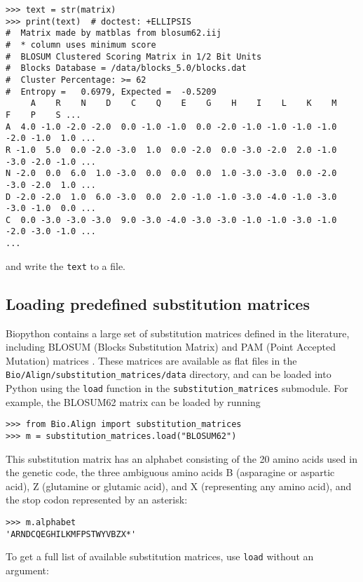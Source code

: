 \begin{verbatim}
>>> text = str(matrix)
>>> print(text)  # doctest: +ELLIPSIS
#  Matrix made by matblas from blosum62.iij
#  * column uses minimum score
#  BLOSUM Clustered Scoring Matrix in 1/2 Bit Units
#  Blocks Database = /data/blocks_5.0/blocks.dat
#  Cluster Percentage: >= 62
#  Entropy =   0.6979, Expected =  -0.5209
     A    R    N    D    C    Q    E    G    H    I    L    K    M    F    P    S ...
A  4.0 -1.0 -2.0 -2.0  0.0 -1.0 -1.0  0.0 -2.0 -1.0 -1.0 -1.0 -1.0 -2.0 -1.0  1.0 ...
R -1.0  5.0  0.0 -2.0 -3.0  1.0  0.0 -2.0  0.0 -3.0 -2.0  2.0 -1.0 -3.0 -2.0 -1.0 ...
N -2.0  0.0  6.0  1.0 -3.0  0.0  0.0  0.0  1.0 -3.0 -3.0  0.0 -2.0 -3.0 -2.0  1.0 ...
D -2.0 -2.0  1.0  6.0 -3.0  0.0  2.0 -1.0 -1.0 -3.0 -4.0 -1.0 -3.0 -3.0 -1.0  0.0 ...
C  0.0 -3.0 -3.0 -3.0  9.0 -3.0 -4.0 -3.0 -3.0 -1.0 -1.0 -3.0 -1.0 -2.0 -3.0 -1.0 ...
...
\end{verbatim}
and write the \verb+text+ to a file.

\subsection{Loading predefined substitution matrices}

Biopython contains a large set of substitution matrices defined in the literature, including BLOSUM (Blocks Substitution Matrix) \cite{henikoff1992} and PAM (Point Accepted Mutation) matrices \cite{dayhoff1978}. These matrices are available as flat files in the \verb+Bio/Align/substitution_matrices/data+ directory, and can be loaded into Python using the \verb+load+ function in the \verb+substitution_matrices+ submodule. For example, the BLOSUM62 matrix can be loaded by running

\begin{verbatim}
>>> from Bio.Align import substitution_matrices
>>> m = substitution_matrices.load("BLOSUM62")
\end{verbatim}
This substitution matrix has an alphabet consisting of the 20 amino acids used in the genetic code, the three ambiguous amino acids B (asparagine or aspartic acid), Z (glutamine or glutamic acid), and X (representing any amino acid), and the stop codon represented by an asterisk:

\begin{verbatim}
>>> m.alphabet
'ARNDCQEGHILKMFPSTWYVBZX*'
\end{verbatim}

To get a full list of available substitution matrices, use \verb+load+ without an argument:

